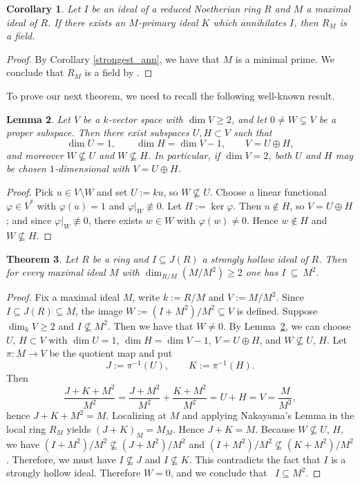 \documentclass[11pt,english]{amsart}
\newtheorem{theorem}{Theorem}[section]
\newtheorem{lemma}[theorem]{Lemma}
\newtheorem{corollary}[theorem]{Corollary}
\theoremstyle{definition}
\numberwithin{equation}{section}
\theoremstyle{remark}
\begin{document}
\begin{corollary}
    Let $I$ be an ideal of a reduced Noetherian ring $R$ and $M$ a maximal ideal of $R$. If there exists an $M$-primary ideal $K$ which annihilates $I$, then $R_M$ is a field. 
\end{corollary}

\begin{proof}
    By Corollary \ref{strongest_ann}, we have that $M$ is a minimal prime. We conclude that $R_M$ is a field by \cite[\href{https://stacks.math.columbia.edu/tag/00EU}{Tag 00EU}]{Stacks}.
\end{proof}

To prove our next theorem, we need to recall the following well-known result.
\begin{lemma}\label{UH_avoid_W}
Let $V$ be a $k$-vector space with $\dim V\ge 2$, and let $0\neq W\subsetneq V$ be a proper subspace.
Then there exist subspaces $U,H\subset V$ such that
\[
\dim U=1,\qquad\dim H=\dim V-1,\qquad V=U\oplus H,
\]
and moreover $W\nsubseteq U$ and $W\nsubseteq H$.
In particular, if $\dim V=2$, both $U$ and $H$ may be chosen $1$-dimensional with $V=U\oplus H$.
\end{lemma}

\begin{proof}
Pick $u\in V\setminus W$ and set $U:=ku$, so $W\nsubseteq U$. 
Choose a linear functional $\varphi\in V^\ast$ with $\varphi(u)=1$ and $\varphi|_W\not\equiv 0$.
Let $H:=\ker\varphi$. Then $u\notin H$, so $V=U\oplus H$; and since $\varphi|_W\not\equiv 0$, there exists $w\in W$ with $\varphi(w)\neq 0$. Hence $w\notin H$ and $W\nsubseteq H$.
\end{proof}

\begin{theorem}\label{I_in_M2}
Let $R$ be a ring and $I\subseteq J(R)$ a strongly hollow ideal of $R$. Then for every maximal ideal $M$ with $\dim_{R/M}(M/M^2)\ge 2$ one has
$
I\ \subseteq\ M^2.
$
\end{theorem}

\begin{proof}
Fix a maximal ideal $M$, write $k:=R/M$ and $V:=M/M^2$. Since $I\subseteq J(R)\subseteq M$,
the image $W:=(I+M^2)/M^2\subseteq V$ is defined. Suppose $\dim_k V\ge 2$ and $I\nsubseteq M^2$. Then we have that $W\neq 0$. By Lemma~\ref{UH_avoid_W}, we can choose $U$, $H\subset V$ with
$\dim U=1$, $\dim H=\dim V -1$, $V=U\oplus H$, and $W\nsubseteq U$, $H$.
Let $\pi:M\to V$ be the quotient map and put
\[
J:=\pi^{-1}(U),\qquad K:=\pi^{-1}(H).
\]
Then
\[
\frac{J+K+M^2}{M^2}
=\frac{J+M^2}{M^2}+\frac{K+M^2}{M^2}
=U+H
=V
=\frac{M}{M^2},
\]
hence $J+K+M^2=M$. Localizing at $M$ and applying Nakayama’s Lemma in the local ring $R_M$ yields $(J+K)_M=M_M$. Hence $J+K=M$. Because $W\nsubseteq U$, $H$, we have
$(I+M^2)/M^2\nsubseteq(J+M^2)/M^2$ and $(I+M^2)/M^2\nsubseteq(K+M^2)/M^2$. Therefore, we must have $I\nsubseteq J$ and $I\nsubseteq K$. This contradicts the fact that $I$ is a strongly hollow ideal.
Therefore $W=0$, and we conclude that \ $I\subseteq M^2$.
\end{proof}
\end{document}
